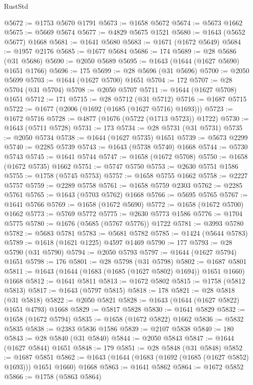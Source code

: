 \begin{lexlean}{RustStd}
\begin{coremodule}
@5672 := @1753 @5670 @1791
@5673 := @1658 @5672
@5674 := @5673 @1662
@5675 := @5669 @5674
@5677 := @4829 @5675 @1521
@5680 := @1643 (@5652 @5677) @1668
@5681 := @1641 @5680
@5683 := @1671 (@1672 @5649)
@5684 := @1957 @2176
@5685 := @1677 @5684
@5686 := 174
@5689 := @28 @5686 (@31 @5686)
@5690 := @2050 @5689
@5695 := @1643 (@1644 (@1627 @5690) @1651 @1766)
@5696 := 175
@5699 := @28 @5696 (@31 @5696)
@5700 := @2050 @5699
@5703 := @1644 (@1627 @5700) @1651
@5704 := 172
@5707 := @28 @5704 (@31 @5704)
@5708 := @2050 @5707
@5711 := @1644 (@1627 @5708) @1651
@5712 := 171
@5715 := @28 @5712 (@31 @5712)
@5716 := @1687 @5715
@5722 := @1677 (@2006 (@1692 (@1685 (@1627 @5716) @1693)))
@5723 := @1672 @5716
@5728 := @4877 (@1676 (@5722 (@1713 @5723)) @1722)
@5730 := @1643 (@5711 @5728)
@5731 := 173
@5734 := @28 @5731 (@31 @5731)
@5735 := @2050 @5734
@5738 := @1644 (@1627 @5735) @1651
@5739 := @5673 @2299
@5740 := @2285 @5739
@5743 := @1643 (@5738 @5740) @1668
@5744 := @5730 @5743
@5745 := @1641 @5744
@5747 := @1658 (@1672 @5708)
@5750 := @1658 (@1672 @5735) @1662
@5751 := @5747 @5750
@5753 := @2630 @5751 @1586
@5755 := @1758 (@5745 @5753)
@5757 := @1658 @5755 @1662
@5758 := @2227 @5757
@5759 := @2289 @5758
@5761 := @1658 @5759 @2303
@5762 := @2285 @5761
@5765 := @1643 (@5703 @5762) @1668
@5766 := @5695 @5765
@5767 := @1641 @5766
@5769 := @1658 (@1672 @5690)
@5772 := @1658 (@1672 @5700) @1662
@5773 := @5769 @5772
@5775 := @2630 @5773 @1586
@5776 := @1704 @5775
@5780 := @1676 (@5685 (@5767 @5776)) @1722
@5781 := @3993 @5780
@5782 := @5683 @5781
@5783 := @5681 @5782
@5785 := @1424 (@5644 @5783)
@5789 := @1618 (@1621 @1225) @4597 @1469
@5790 := 177
@5793 := @28 @5790 (@31 @5790)
@5794 := @2050 @5793
@5797 := @1644 (@1627 @5794) @1651
@5798 := 176
@5801 := @28 @5798 (@31 @5798)
@5802 := @1687 @5801
@5811 := @1643 (@1644 (@1683 (@1685 (@1627 @5802) @1694)) @1651 @1660) @1668
@5812 := @1641 @5811
@5813 := @1672 @5802
@5815 := @1758 (@5812 @5813)
@5817 := @1643 (@5797 @5815)
@5818 := 178
@5821 := @28 @5818 (@31 @5818)
@5822 := @2050 @5821
@5828 := @1643 (@1644 (@1627 @5822) @1651 @4793) @1668
@5829 := @5817 @5828
@5830 := @1641 @5829
@5832 := @1658 (@1672 @5794)
@5835 := @1658 (@1672 @5822) @1662
@5836 := @5832 @5835
@5838 := @2383 @5836 @1586
@5839 := @2107 @5838
@5840 := 180
@5843 := @28 @5840 (@31 @5840)
@5844 := @2050 @5843
@5847 := @1644 (@1627 @5844) @1651
@5848 := 179
@5851 := @28 @5848 (@31 @5848)
@5852 := @1687 @5851
@5862 := @1643 (@1644 (@1683 (@1692 (@1685 (@1627 @5852) @1693))) @1651 @1660) @1668
@5863 := @1641 @5862
@5864 := @1672 @5852
@5866 := @1758 (@5863 @5864)

\end{coremodule}
\end{lexlean}
